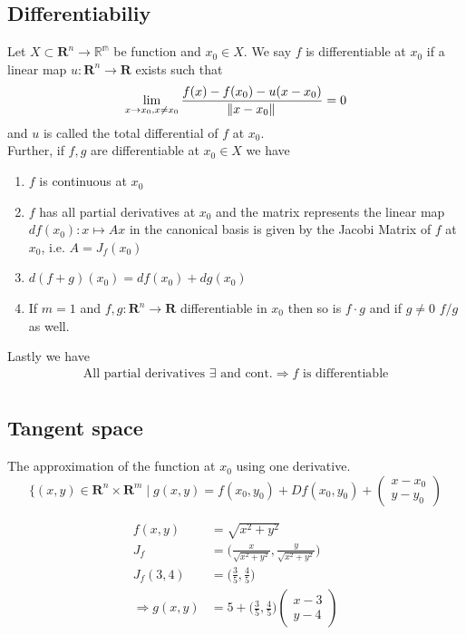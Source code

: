 \documentclass[8pt]{extarticle}
\newcommand{\R}{{\mathbb R}}
\newcommand{\X}{{\mathcal X}}
\newcommand{\ra}{{\rightarrow}}
\def\R{\mathbf{R}}
\def\X{X}
\def\BoxStart{\begin{tcolorbox}[colback=blue!5!white,colframe=blue!75!black]}
\def\BoxEnd{\end{tcolorbox}}
\begin{document}
\begin{multicols*}{3}
  \subsection{Differentiabiliy}
  Let $\X \subset \R^n \ra \mathbb{R^m}$ be function
  and $x_0 \in \X$. We say $f$ is differentiable at $x_0$ if a linear map
  $u: \R^n \ra \R$ exists such that
  \begin{align*}
    \lim_{x \ra x_0, x \neq x_0} \frac{f(x) - f(x_0) - u(x - x_0)}{\norm*{x - x_0}} = 0
  \end{align*}
  and $u$ is called the total differential of $f$ at $x_0$.\\
  Further, if $f, g$ are differentiable at $x_0 \in \X$
  we have
  \begin{enumerate}[label=(\arabic*)]
    \item $f$ is continuous at $x_0$
    \item $f$ has all partial derivatives at $x_0$ and the
          matrix represents the linear map $df(x_0): x \mapsto Ax$
          in the canonical basis is given by the Jacobi Matrix of $f$
          at $x_0$, i.e. $A = J_f(x_0)$
    \item $d(f + g)(x_0) = df(x_0) + dg(x_0)$
    \item If $m = 1$ and $f, g: \R^n \ra \R$
          differentiable in $x_0$ then so is $f \cdot g$
          and if $g \neq 0$ $f / g$ as well.
  \end{enumerate}
  Lastly we have
  \begin{align*}
    \text{All partial derivatives $\exists$ and cont.}
    \Rightarrow f \text{ is differentiable} \\
  \end{align*}
  \subsection{Tangent space}
  The approximation of the function at $x_0$ using one derivative.
  $$\{(x, y) \in \R^n \times \R^m \;|\; g(x, y) = f(x_0, y_0) + Df(x_0, y_0) +  
	\begin{pmatrix} x - x_0 \\
			     y - y_0
	\end{pmatrix}$$
\BoxStart
  \begin{align*}
    f(x, y)             & = \sqrt{x^2 + y^2}                                                   \\
    J_f                 & = \Big( \frac{x}{\sqrt{x^2 + y^2}}, \frac{y}{\sqrt{x^2 + y^2}} \Big) \\
    J_f(3, 4)           & = \Big(\frac{3}{5}, \frac{4}{5}\Big)                                       \\
    \Rightarrow g(x, y) & = 5 + \Big(\frac{3}{5}, \frac{4}{5} \Big)\begin{pmatrix}
      x-3 \\
      y-4
    \end{pmatrix}
  \end{align*}
\BoxEnd

\end{multicols*}
\end{document}
